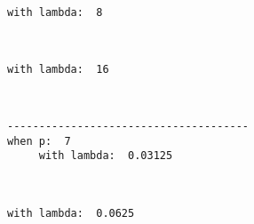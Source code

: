 \documentclass[11pt]{article}
\begin{document}
    \begin{center}
    \end{center}
    { \hspace*{\fill} \\}
    
    \begin{Verbatim}[commandchars=\\\{\}]
     with lambda:  8

    \end{Verbatim}

    \begin{center}
    \end{center}
    { \hspace*{\fill} \\}
    
    \begin{Verbatim}[commandchars=\\\{\}]
     with lambda:  16

    \end{Verbatim}

    \begin{center}
    \end{center}
    { \hspace*{\fill} \\}
    
    \begin{Verbatim}[commandchars=\\\{\}]
--------------------------------------
when p:  7
     with lambda:  0.03125

    \end{Verbatim}

    \begin{center}
    \end{center}
    { \hspace*{\fill} \\}
    
    \begin{Verbatim}[commandchars=\\\{\}]
     with lambda:  0.0625

    \end{Verbatim}

    \begin{center}
    \end{center}
    { \hspace*{\fill} \\}
    
\end{document}
